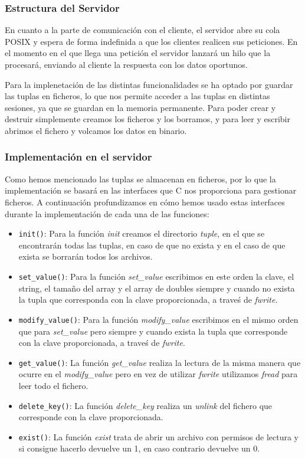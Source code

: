 \documentclass[]{article}
\begin{document}
\subsubsection{Estructura del Servidor}
\label{subsec::estructura_servidor}
En cuanto a la parte de comunicación con el cliente, el servidor abre su cola POSIX y espera de forma indefinida a que los clientes realicen sus peticiones. En el momento en el que llega una petición el servidor lanzará un hilo que la procesará, enviando al cliente la respuesta con los datos oportunos.

Para la implenetación de las distintas funcionalidades se ha optado por guardar las tuplas en ficheros, lo que nos permite acceder a las tuplas en distintas sesiones, ya que se guardan en la memoria permanente.
Para poder crear y destruir simplemente creamos los ficheros y los borramos, y para leer y escribir abrimos el fichero y volcamos los datos en binario.

\subsubsection{Implementación en el servidor}
\label{subsec::implementacion_servidor}
Como hemos mencionado las tuplas se almacenan en ficheros, por lo que la implementación se basará en las interfaces que C nos proporciona para gestionar ficheros.
A continuación profundizamos en cómo hemos usado estas interfaces durante la implementación de cada una de las funciones:

\begin{itemize}
  \item \texttt{init()}: Para la función \textit{init} creamos el directorio \textit{tuple}, en el que se encontrarán todas las tuplas, en caso de que no exista y en el caso de que exista se borrarán todos los archivos. 
  \item \texttt{set\_value()}: Para la función \textit{set\_value} escribimos en este orden la clave, el string, el tamaño del array y el array de doubles siempre y cuando no exista la tupla que corresponda con la clave proporcionada, a traveś de \textit{fwrite}.
  \item \texttt{modify\_value()}: Para la función \textit{modify\_value} escribimos en el mismo orden que para \textit{set\_value} pero siempre y cuando exista la tupla que corresponde con la clave proporcionada, a traveś de \textit{fwrite}.
  \item \texttt{get\_value()}: La función \textit{get\_value} realiza la lectura de la misma manera que ocurre en el \textit{modify\_value} pero en vez de utilizar \textit{fwrite} utilizamos \textit{fread} para leer todo el fichero.
  \item \texttt{delete\_key()}: La función \textit{delete\_key} realiza un \textit{unlink} del fichero que corresponde con la clave proporcionada.
  \item \texttt{exist()}: La función \textit{exist} trata de abrir un archivo con permisos de lectura y si consigue hacerlo devuelve un 1, en caso contrario devuelve un 0.
\end{itemize}
\end{document}
